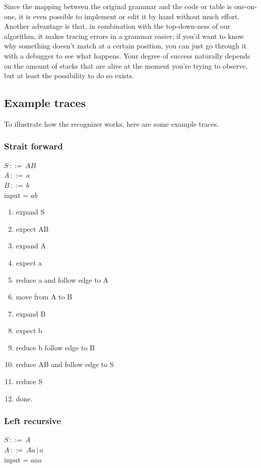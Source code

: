 \documentclass[a4paper,10pt]{article}
\begin{document}
Since the mapping between the original grammar and the code or table is one-on-one, it is even possible to implement or edit it by hand without much effort. Another advantage is that, in combination with the top-down-ness of our algorithm, it makes tracing errors in a grammar easier; if you'd want to know why something doesn't match at a certain position, you can just go through it with a debugger to see what happens. Your degree of success naturally depends on the amount of stacks that are alive at the moment you're trying to observe, but at least the possibility to do so exists.

\subsection{Example traces}

To illustrate how the recognizer works, here are some example traces.

\subsubsection{Strait forward}
$S\,::=\,AB$\\
$A\,::=\,a$\\
$B\,::=\,b$\\
input = $ab$

\begin{enumerate}
 \setlength{\itemsep}{0pt}
 \setlength{\parskip}{0pt}
 \setlength{\parsep}{0pt}
 
 \item expand S
 \item expect AB
 \item expand A
 \item expect a
 \item reduce a and follow edge to A
 \item move from A to B
 \item expand B
 \item expect b
 \item reduce b follow edge to B
 \item reduce AB and follow edge to S
 \item reduce S
 \item done.
\end{enumerate}

\subsubsection{Left recursive}
$S\,::=\,A$\\
$A\,::=\,Aa\,|\,a$\\
input = $aaa$
\end{document}
